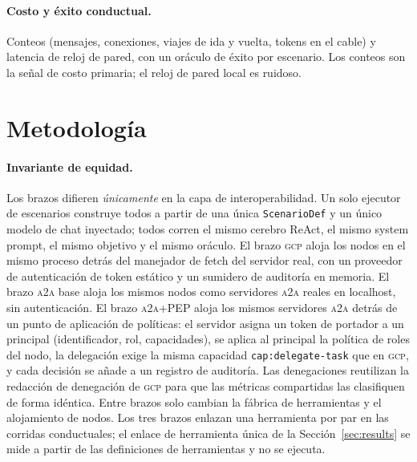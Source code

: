 \documentclass[conference,letterpaper]{IEEEtran}
\newcommand{\gcp}{\textsc{gcp}}
\newcommand{\ata}{\textsc{a2a}}
\begin{document}
\paragraph{Costo y \'exito conductual.} Conteos (mensajes, conexiones, viajes de ida y vuelta, tokens
en el cable) y latencia de reloj de pared, con un or\'aculo de \'exito por escenario. Los conteos son
la se\~nal de costo primaria; el reloj de pared local es ruidoso.

\section{Metodolog\'ia}
\label{sec:method}

\paragraph{Invariante de equidad.} Los brazos difieren \emph{únicamente} en la capa de
interoperabilidad. Un solo ejecutor de escenarios construye todos a partir de una única
\texttt{ScenarioDef} y un único modelo de chat inyectado; todos corren el mismo cerebro ReAct, el
mismo system prompt, el mismo objetivo y el mismo oráculo. El brazo \gcp{} aloja los nodos en el mismo
proceso detrás del manejador de fetch del servidor real, con un proveedor de autenticación de token
estático y un sumidero de auditoría en memoria. El brazo \ata{} base aloja los mismos nodos como
servidores \ata{} reales en localhost, sin autenticación. El brazo \ata{}+PEP aloja los mismos
servidores \ata{} detrás de un punto de aplicación de políticas: el servidor asigna un token de
portador a un principal (identificador, rol, capacidades), se aplica al principal la política de roles
del nodo, la delegación exige la misma capacidad \texttt{cap:delegate-task} que en \gcp{}, y cada
decisión se añade a un registro de auditoría. Las denegaciones reutilizan la redacción de denegación de
\gcp{} para que las métricas compartidas las clasifiquen de forma idéntica. Entre brazos solo cambian la
fábrica de herramientas y el alojamiento de nodos. Los tres brazos enlazan una herramienta por par en
las corridas conductuales; el enlace de herramienta única de la Sección~\ref{sec:results} se mide a
partir de las definiciones de herramientas y no se ejecuta.
\end{document}
